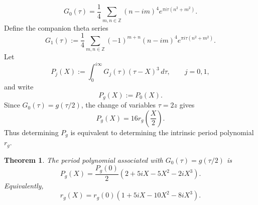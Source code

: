 \documentclass[preprint,12pt]{elsarticle}
\newtheorem{theorem}{Theorem}[section]
\theoremstyle{definition}
\theoremstyle{remark}
\begin{document}
\[
G_0(\tau)
=
\frac{1}{4}\sum_{m,n\in\mathbb Z}
(n-im)^4e^{\pi i\tau(n^2+m^2)}.
\]
Define the companion theta series
\[
G_1(\tau)
:=
\frac{1}{4}\sum_{m,n\in\mathbb Z}
(-1)^{m+n}(n-im)^4e^{\pi i\tau(n^2+m^2)}.
\]
Let
\[
P_j(X):=\int_0^{i\infty}G_j(\tau)(\tau-X)^3\,d\tau,
\qquad j=0,1,
\]
and write
\[
P_g(X):=P_0(X).
\]
Since $G_0(\tau)=g(\tau/2)$, the change of variables $\tau=2z$ gives
\[
P_g(X)=16r_g\left(\frac{X}{2}\right).
\]
Thus determining $P_g$ is equivalent to determining the intrinsic period polynomial $r_g$.

\begin{theorem}
	The period polynomial associated with $G_0(\tau)=g(\tau/2)$ is
	\[
	P_g(X)=\frac{P_g(0)}{2}\left(2+5iX-5X^2-2iX^3\right).
	\]
	Equivalently,
	\[
	r_g(X)=r_g(0)\left(1+5iX-10X^2-8iX^3\right).
	\]
\end{theorem}
\end{document}
